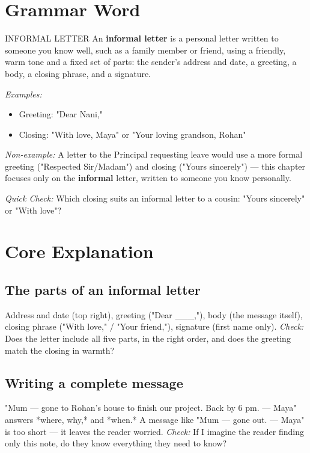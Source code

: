 \section{Grammar Word}
\begin{grammarword}{INFORMAL LETTER}
An \textbf{informal letter} is a personal letter written to someone you know well, such as a family member or friend, using a friendly, warm tone and a fixed set of parts: the sender's address and date, a greeting, a body, a closing phrase, and a signature.

\textit{Examples:}
\begin{itemize}
    \item Greeting: "Dear Nani,"
    \item Closing: "With love, Maya" or "Your loving grandson, Rohan"
\end{itemize}

\textit{Non-example:} A letter to the Principal requesting leave would use a more formal greeting ("Respected Sir/Madam") and closing ("Yours sincerely") — this chapter focuses only on the \textbf{informal} letter, written to someone you know personally.

\textit{Quick Check:} Which closing suits an informal letter to a cousin: "Yours sincerely" or "With love"?
\end{grammarword}

\section{Core Explanation}
\subsection*{The parts of an informal letter}
Address and date (top right), greeting ("Dear \_\_\_,"), body (the message itself), closing phrase ("With love," / "Your friend,"), signature (first name only). \textit{Check:} Does the letter include all five parts, in the right order, and does the greeting match the closing in warmth?

\subsection*{Writing a complete message}
"Mum — gone to Rohan's house to finish our project. Back by 6 pm. — Maya" answers *where, why,* and *when.* A message like "Mum — gone out. — Maya" is too short — it leaves the reader worried. \textit{Check:} If I imagine the reader finding only this note, do they know everything they need to know?

